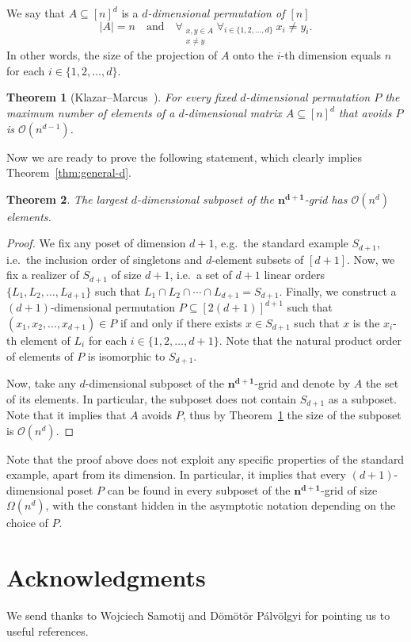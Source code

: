 \documentclass[a4paper,reqno,12pt]{amsart}
\newtheorem{theorem}{Theorem}
\theoremstyle{remark}
\theoremstyle{plain}
\theoremstyle{definition}
\renewcommand{\O}{\mathcal{O}}
\let\subset\subseteq
\begin{document}
We say that $A \subset [n]^d$ is a \emph{$d$-dimensional permutation of $[n]$}
\[
|A|=n \quad \text{and} \quad \forall_{\substack{x, y \in A\\x \neq y}}
                               \forall_{i\in\{1, 2, \ldots, d\}}\
                               x_i \neq y_i.
\]
In other words, the size of the projection of $A$ onto the $i$-th dimension
equals $n$ for each $i \in \{1, 2, \ldots, d\}$.

\begin{theorem}[Klazar--Marcus~\cite{Klazar2007}]
\label{thm:avoidance}
For every fixed $d$-dimensional permutation $P$ the maximum number of elements
of a $d$-dimensional matrix $A \subset [n]^d$ that avoids $P$ is $\O(n^{d-1})$.
\end{theorem}

Now we are ready to prove the following statement, which clearly implies
Theorem~\ref{thm:general-d}.

\begin{theorem}
The largest $d$-dimensional subposet of the $\mathbf{n^{d+1}}$-grid has
$\O(n^d)$ elements.
\end{theorem}

\begin{proof}
We fix any poset of dimension $d+1$, e.g.~the standard example $S_{d+1}$,
i.e.~the inclusion order of singletons and $d$-element subsets of $[d+1]$.
Now, we fix a realizer of $S_{d+1}$
of size $d+1$, i.e.~a set of $d+1$ linear orders $\{L_1, L_2,\ldots,L_{d+1}\}$
such that $L_1 \cap L_2 \cap \cdots \cap L_{d+1} = S_{d+1}$.
Finally, we construct a $(d+1)$-dimensional permutation
$P \subset [2(d+1)]^{d+1}$ such that $(x_1, x_2, \ldots, x_{d+1}) \in P$ if and
only if there exists $x \in S_{d+1}$ such that $x$ is the $x_i$-th element of
$L_i$ for each $i \in \{1, 2, \ldots, d+1\}$. Note that the natural product
order of elements of $P$ is isomorphic to $S_{d+1}$.

Now, take any $d$-dimensional subposet of the $\mathbf{n^{d+1}}$-grid and denote by $A$ the
set of its elements. In particular, the subposet does not contain $S_{d+1}$ as
a subposet. Note that it implies that $A$ avoids $P$,
thus by Theorem~\ref{thm:avoidance} the size of the subposet is $\O(n^d)$.
\end{proof}

Note that the proof above does not exploit any specific properties of the
standard example, apart from its dimension. In particular, it implies that
every $(d+1)$-dimensional poset $P$ can be found in every subposet of the
$\mathbf{n^{d+1}}$-grid of size $\Omega(n^d)$, with the constant hidden in the
asymptotic notation depending on the choice of $P$.


\section*{Acknowledgments}

We send thanks to Wojciech Samotij and Dömötör Pálvölgyi for pointing us to
useful references.



\end{document}
